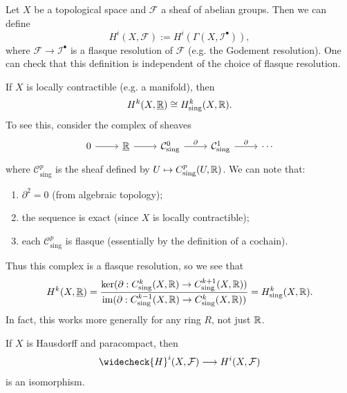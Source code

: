 \begin{definition}
  Let $X$ be a topological space and
  $\mathcal{F}$ a sheaf of abelian groups.
  Then we can define
  \[
    H^i(X, \mathcal{F})
    := H^i(\Gamma(X, \mathcal{I}^\bullet)),
  \]
  where $\mathcal{F} \to \mathcal{I}^\bullet$ is a flasque resolution of $\mathcal{F}$ (e.g. the Godement resolution).
  One can check that this definition is
  independent of the choice of flasque resolution.
\end{definition}

\begin{example}
  If $X$ is locally contractible
  (e.g. a manifold), then
  \[
    H^k(X, \underline{\mathbb{R}})
    \cong H^k_{\mathrm{sing}}(X, \mathbb{R}).
  \]
  To see this, consider the complex of sheaves
  \[
    \begin{tikzcd}
      0 \ar[r] & \underline{\R}
      \ar[r] & \mathcal{C}^0_{\mathrm{sing}}
      \ar[r, "\partial"] & \mathcal{C}^1_{\mathrm{sing}}
      \ar[r, "\partial"] & \cdots
    \end{tikzcd}
  \]
  where $\mathcal{C}^p_{\mathrm{sing}}$ is
  the sheaf defined by
  $U \mapsto C^p_{\mathrm{sing}}(U, \mathbb{R})$.
  We can note that:
  \begin{enumerate}
    \item $\partial^2 = 0$ (from algebraic topology);
    \item the sequence is exact
      (since $X$ is locally contractible);
    \item each $\mathcal{C}^p_{\mathrm{sing}}$ is flasque (essentially by the definition of a cochain).
  \end{enumerate}
  Thus this complex is a flasque resolution,
  so we
  see that
  \[
    H^k(X, \underline{\mathbb{R}}) = \frac{\ker(\partial : C^k_{\mathrm{sing}}(X, \mathbb{R}) \to C^{k + 1}_{\mathrm{sing}}(X, \mathbb{R}))}{{\operatorname{im}(\partial : C^{k - 1}_{\mathrm{sing}}(X, \mathbb{R}) \to C^k_{\mathrm{sing}}(X, \mathbb{R}))}}
    = H^k_{\mathrm{sing}}(X, \mathbb{R}).
  \]
  In fact, this works more generally for
  any ring $R$, not just $\mathbb{R}$.
\end{example}

\pagebreak

\begin{theorem}
  If $X$ is Hausdorff and paracompact,
  then
  \[
    \widecheck{H}^i(X, \mathcal{F})
    \longrightarrow H^i(X, \mathcal{F})
  \]
  is an isomorphism.
\end{theorem}

